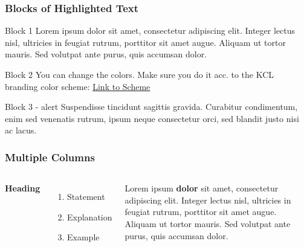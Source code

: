 \documentclass{beamer}
\begin{document}

\begin{frame}
\frametitle{Blocks of Highlighted Text}
\begin{block}{Block 1}
Lorem ipsum dolor sit amet, consectetur adipiscing elit. Integer lectus nisl, ultricies in feugiat rutrum, porttitor sit amet augue. Aliquam ut tortor mauris. Sed volutpat ante purus, quis accumsan dolor.
\end{block}

{
\begin{block}{Block 2}
You can change the colors. Make sure you do it  acc. to the KCL branding color scheme:
\href{https://internal.kcl.ac.uk/erd/depts/brand-and-marketing-portal/Documents/brand-resources/docs/Colour-palette.pdf}{\color{PantoneLimeGreen}\underline{Link to Scheme}}
\end{block}
}

\begin{alertblock}{Block 3 - alert}
Suspendisse tincidunt sagittis gravida. Curabitur condimentum, enim sed venenatis rutrum, ipsum neque consectetur orci, sed blandit justo nisi ac lacus.
\end{alertblock}
\end{frame}


\begin{frame}
\frametitle{Multiple Columns}
\begin{columns}[c] %

\textbf{Heading}
\begin{enumerate}
\item Statement
\item Explanation
\item Example
\end{enumerate}

Lorem ipsum \textbf{dolor} sit amet, consectetur adipiscing elit. Integer lectus nisl, ultricies in feugiat rutrum, porttitor sit amet augue. Aliquam ut tortor mauris. Sed volutpat ante purus, quis accumsan dolor.

\end{columns}
\end{frame}
\end{document}
